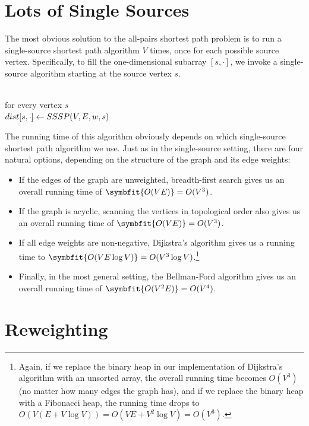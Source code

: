 \section{Lots of Single Sources}
\label{sec:9.2}

The most obvious solution to the all-pairs shortest path problem is to run a single-source shortest path algorithm $V$ times, once for each possible source vertex.
Specifically, to fill the one-dimensional subarray $[s, \cdot]$, we invoke a single-source algorithm starting at the source vertex $s$.

\begin{pseudocode}
\\
for every vertex $s$\\
\Indent $dist[s, \cdot] \gets SSSP(V, E, w, s)$
\end{pseudocode}

The running time of this algorithm obviously depends on which single-source shortest path algorithm we use.
Just as in the single-source setting, there are four natural options, depending on the structure of the graph and its edge weights:
\begin{itemize}
\item If the edges of the graph are unweighted, breadth-first search gives us an overall running time of $\symbfit{O(VE)} = O(V^3)$.
\item If the graph is acyclic, scanning the vertices in topological order also gives us an overall running time of $\symbfit{O(VE)} = O(V^3)$.
\item If all edge weights are non-negative, Dijkstra’s algorithm gives us a running time to $\symbfit{O(VE \log V)} = O(V^3 \log V)$.\footnote{Again, if we replace the binary heap in our implementation of Dijkstra’s algorithm with an unsorted array, the overall running time becomes $O(V^3)$ (no matter how many edges the graph has), and if we replace the binary heap with a Fibonacci heap, the running time drops to $O(V(E + V \log V)) = O(VE + V^2 \log V) = O(V^3)$.}
\item Finally, in the most general setting, the Bellman-Ford algorithm gives us an overall running time of $\symbfit{O(V^2E)} = O(V^4)$.
\end{itemize}

\section{Reweighting}
\label{sec:9.3}

